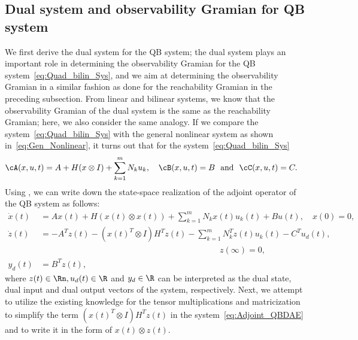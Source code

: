 \subsection{Dual system and observability Gramian for QB system}
We first derive the dual system for the QB system; the dual system plays an important role in determining the observability Gramian for the QB system~\eqref{eq:Quad_bilin_Sys}, and we aim at determining the observability Gramian in a similar fashion as done for the reachability Gramian in the preceding subsection. From linear and bilinear systems, we know that the observability Gramian of the dual system is the same as the reachability Gramian; here, we also consider the same analogy. If we compare the system~\eqref{eq:Quad_bilin_Sys} with the general nonlinear system as shown in~\eqref{eq:Gen_Nonlinear},  it turns out that for the system~\eqref{eq:Quad_bilin_Sys}
\begin{align*}
 \cA(x,u,t) &= A + H(x\otimes I) + \sum_{k=1}^mN_ku_k,\quad  \cB(x,u,t) = B~~\text{and}~~ \cC(x,u,t) = C.
\end{align*}
Using , we can write down the state-space realization of the adjoint operator of the QB system as follows:
\begin{subequations}\label{eq:Adjoint_QBDAE}
 \begin{align}
  \dot{x}(t) &= Ax(t) + H(x(t) \otimes x(t))  + \sum_{k=1}^mN_kx(t)u_k(t) + Bu(t), \quad x(0) = 0,\\
  \dot{z}(t) &= -A^Tz(t) - ( x(t)^T\otimes I)H^T z(t) - \sum_{k=1}^mN_k^T z(t)u_k(t) - C^Tu_d(t), \\ &\hspace{9cm}z(\infty) = 0,\nonumber\\
  y_d(t) &= B^Tz(t),
 \end{align}
\end{subequations}
where $z(t)\in \Rn, u_d(t) \in \R$ and $y_d \in \R$ can be interpreted as the dual state, dual input and dual output vectors of the system, respectively. Next, we attempt to utilize the existing knowledge for the tensor multiplications and matricization  to simplify the term $(x(t)^T\otimes I)H^T z(t)$ in the system~\eqref{eq:Adjoint_QBDAE} and to write it in  the form of $x(t)\otimes z(t)$.

